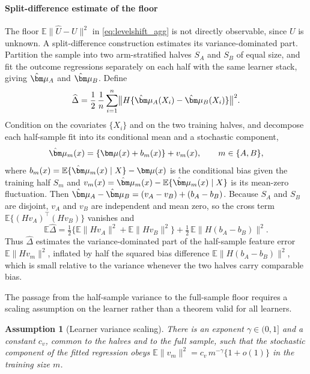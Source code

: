 \documentclass[11pt]{article}
\newtheorem{assumption}{Assumption}
\newcommand{\E}{\mathbb E}
\newcommand{\bmu}{\bm\mu}
\newcommand{\hU}{\widehat U}
\newcommand{\norm}[1]{\lVert #1\rVert}
\begin{document}
\paragraph{Split-difference estimate of the floor}
The floor $\E\norm{\hU-U}^2$ in \eqref{eq:levelshift_agg} is not directly observable, since $U$ is unknown. A split-difference construction estimates its variance-dominated part. Partition the sample into two arm-stratified halves $S_A$ and $S_B$ of equal size, and fit the outcome regressions separately on each half with the same learner stack, giving $\hat\bmu_A$ and $\hat\bmu_B$. Define
\begin{equation}\label{eq:splitdiff_supp}
\widehat\Delta=\frac12\,\frac1n\sum_{i=1}^n\bigl\|H\{\hat\bmu_A(X_i)-\hat\bmu_B(X_i)\}\bigr\|^2 .
\end{equation}
Condition on the covariates $\{X_i\}$ and on the two training halves, and decompose each half-sample fit into its conditional mean and a stochastic component,
\[
\hat\bmu_m(x)=\{\bmu(x)+b_m(x)\}+v_m(x),\qquad m\in\{A,B\},
\]
where $b_m(x)=\E\{\hat\bmu_m(x)\mid X\}-\bmu(x)$ is the conditional bias given the training half $S_m$ and $v_m(x)=\hat\bmu_m(x)-\E\{\hat\bmu_m(x)\mid X\}$ is its mean-zero fluctuation. Then $\hat\bmu_A-\hat\bmu_B=(v_A-v_B)+(b_A-b_B)$. Because $S_A$ and $S_B$ are disjoint, $v_A$ and $v_B$ are independent and mean zero, so the cross term $\E\{(Hv_A)^\top(Hv_B)\}$ vanishes and
\begin{equation}\label{eq:splitdiff_decomp}
\E\widehat\Delta
=\tfrac12\bigl\{\E\norm{Hv_A}^2+\E\norm{Hv_B}^2\bigr\}
+\tfrac12\,\E\norm{H(b_A-b_B)}^2 .
\end{equation}
Thus $\widehat\Delta$ estimates the variance-dominated part of the half-sample feature error $\E\norm{Hv_m}^2$, inflated by half the squared bias difference $\E\norm{H(b_A-b_B)}^2$, which is small relative to the variance whenever the two halves carry comparable bias.

The passage from the half-sample variance to the full-sample floor requires a scaling assumption on the learner rather than a theorem valid for all learners.

\begin{assumption}[Learner variance scaling]\label{ass:varscaling}
There is an exponent $\gamma\in(0,1]$ and a constant $c_v$, common to the halves and to the full sample, such that the stochastic component of the fitted regression obeys $\E\norm{v_m}^2=c_v\,m^{-\gamma}\{1+o(1)\}$ in the training size $m$.
\end{assumption}
\end{document}
